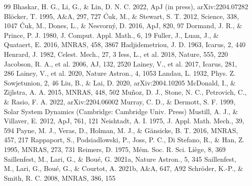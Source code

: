 \documentclass[11pt,a4paper]{article}
\begin{document}
\begin{thebibliography}{99}\small
{} Bhaskar, H. G., Li, G., \& Lin, D. N. C. 2022, ApJ (in press), arXiv:2204.07282
 Bl\"ocker, T. 1995, A\&A, 297, 727
 \'Cuk, M., \& Stewart, S. T. 2012, Science, 338, 1047
 \'Cuk, M., Dones, L., \& Nesvorn\'y, D. 2016, ApJ, 820, 97
 Dormand, J. R., \& Prince, P. J. 1980, J. Comput. Appl. Math., 6, 19
 Fuller, J., Luan, J., \& Quataert, E. 2016, MNRAS, 458, 3867
 Hadjidemetriou, J. D. 1963, Icarus, 2, 440
 Henrard, J. 1982, Celest. Mech., 27, 3
 Iess, L., et al. 2018, Nature, 555, 220
 Jacobson, R. A., et al. 2006, AJ, 132, 2520
 Lainey, V., et al. 2017, Icarus, 281, 286
 Lainey, V., et al. 2020, Nature Astron., 4, 1053
 Landau, L. 1932, Phys. Z. Sowjetunion, 2, 46
 Liu, B., \& Lai, D. 2020, arXiv:2004.10205
 McDonald, I., \& Zijlstra, A. A. 2015, MNRAS, 448, 502
 Mu\~noz, D. J., Stone, N. C., Petrovich, C., \& Rasio, F. A. 2022, arXiv:2204.06002
 Murray, C. D., \& Dermott, S. F. 1999, Solar System Dynamics (Cambridge: Cambridge Univ. Press)
 Mustill, A. J., \& Villaver, E. 2012, ApJ, 761, 121
 Neishtadt, A. I. 1975, J. Appl. Math. Mech., 39, 594
 Payne, M. J., Veras, D., Holman, M. J., \& G\"ansicke, B. T. 2016, MNRAS, 457, 217
 Rappaport, S., Podsiadlowski, P., Joss, P. C., Di Stefano, R., \& Han, Z. 1995, MNRAS, 273, 731
 Reimers, D. 1975, M\'em. Soc. R. Sci. Li\`ege, 8, 369
 Saillenfest, M., Lari, G., \& Bou\'e, G. 2021a, Nature Astron., 5, 345
 Saillenfest, M., Lari, G., Bou\'e, G., \& Courtot, A. 2021b, A\&A, 647, A92
 Schr\"oder, K.-P., \& Smith, R. C. 2008, MNRAS, 386, 155

\end{thebibliography}
\end{document}
